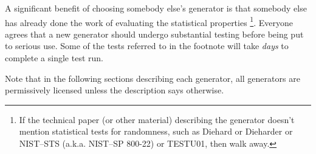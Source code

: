 \documentclass[letterpaper,12pt]{article}
\begin{document}
A significant benefit of choosing somebody else's generator is that
somebody else has already done the work of evaluating the statistical
properties%
\footnote{
  If the technical paper (or other material) describing the generator
  doesn't mention statistical tests for randomness, such as
  Diehard\cite{Marsarglia:Diehard}
  or Dieharder\cite{Brown:Dieharder}
  or NIST--STS (a.k.a. NIST--SP 800-22)\cite{BassinghamEtAl:Statistical}
  or TESTU01\cite{McCullough:TESTU01,L'Ecuyer:TESTU01},
  then walk away.
}.
Everyone agrees that a new generator should undergo substantial testing
before being put to serious use. Some of the tests referred to in the
footnote will take {\em days} to complete a single test run.

Note that in the following sections describing each generator, all
generators are permissively licensed unless the description says otherwise.

\end{document}
